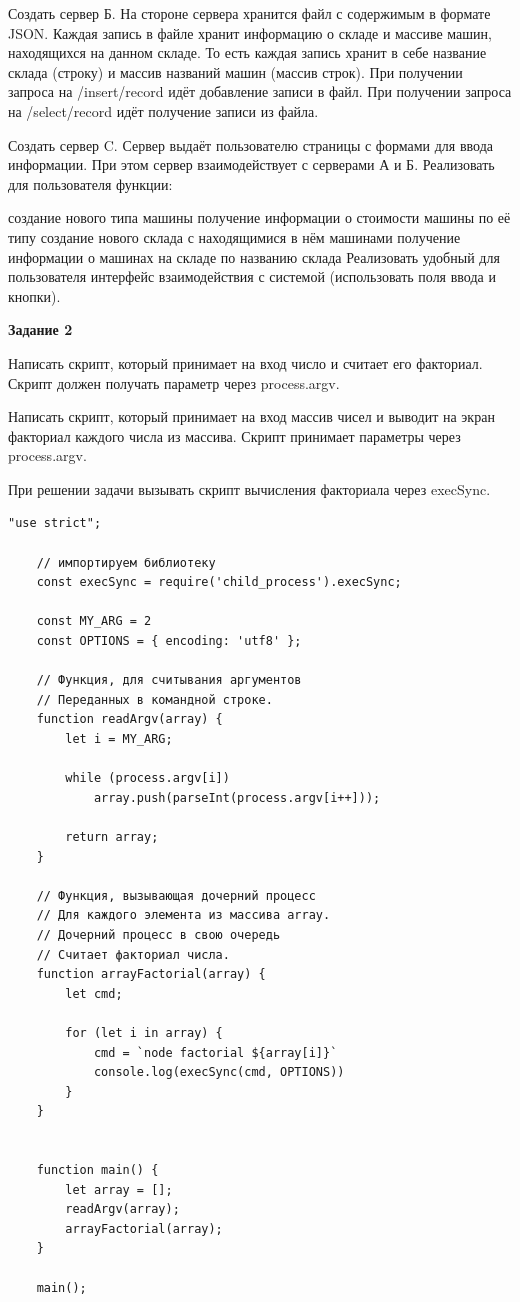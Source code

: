 Создать сервер Б. На стороне сервера хранится файл с содержимым в формате JSON. Каждая запись в файле хранит информацию о складе и массиве машин, находящихся на данном складе. То есть каждая запись хранит в себе название склада (строку) и массив названий машин (массив строк). При получении запроса на /insert/record идёт добавление записи в файл. При получении запроса на /select/record идёт получение записи из файла.

Создать сервер C. Сервер выдаёт пользователю страницы с формами для ввода информации. При этом сервер взаимодействует с серверами А и Б. Реализовать для пользователя функции:

создание нового типа машины
получение информации о стоимости машины по её типу
создание нового склада с находящимися в нём машинами
получение информации о машинах на складе по названию склада
Реализовать удобный для пользователя интерфейс взаимодействия с системой (использовать поля ввода и кнопки).

\textbf{Задание 2}

Написать скрипт, который принимает на вход число и считает его факториал. Скрипт должен получать параметр через process.argv.

Написать скрипт, который принимает на вход массив чисел и выводит на экран факториал каждого числа из массива. Скрипт принимает параметры через process.argv.

При решении задачи вызывать скрипт вычисления факториала через execSync.

\begin{lstlisting}[caption=Код программы. TASK\_2. Главный процесс]
	"use strict";
	
	// импортируем библиотеку
	const execSync = require('child_process').execSync;
	
	const MY_ARG = 2
	const OPTIONS = { encoding: 'utf8' };
	
	// Функция, для считывания аргументов
	// Переданных в командной строке.
	function readArgv(array) {
		let i = MY_ARG;
	
		while (process.argv[i])
			array.push(parseInt(process.argv[i++]));
	
		return array;
	}
	
	// Функция, вызывающая дочерний процесс
	// Для каждого элемента из массива array.
	// Дочерний процесс в свою очередь
	// Считает факториал числа.
	function arrayFactorial(array) {
		let cmd;
	
		for (let i in array) {
			cmd = `node factorial ${array[i]}`
			console.log(execSync(cmd, OPTIONS))
		}
	}
	
	
	function main() {
		let array = [];
		readArgv(array);
		arrayFactorial(array);
	}
	
	main();
\end{lstlisting}


